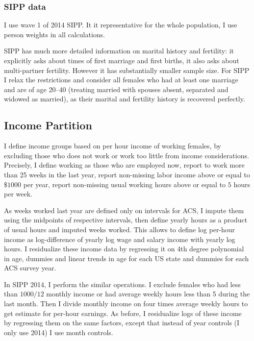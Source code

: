 \documentclass[12pt,letter]{article}
\begin{document}
\subsubsection{SIPP data}

I use wave 1 of 2014 SIPP. It it representative for the whole population, I use person weights in all calculations.

SIPP has much more detailed information on marital history and fertility: it explicitly asks about times of first marriage and first births, it also asks about multi-partner fertility. However it has substantially smaller sample size. For SIPP I relax the restrictions and consider all females who had at least one marriage and are of age 20--40 (treating married with spouses absent, separated and widowed as married), as their marital and fertility history is recovered perfectly.


\subsection{Income Partition\label{inc-part}}
I define income groups based on per hour income of working females, by excluding those who does not work or work too little from income considerations. Precisely, I define working as those who are employed now, report to work more than 25 weeks in the last year, report non-missing labor income above or equal to $\$1000$ per year, report non-missing usual working hours above or equal to $5$ hours per week.

As weeks worked last year are defined only on intervals for ACS, I impute them using the midpoints of respective intervals, then define yearly hours as a product of usual hours and imputed weeks worked. This allows to define log per-hour income as log-difference of yearly log wage and salary income with yearly log hours. I residualize these income data by regressing it on 4th degree polynomial in age, dummies and linear trends in age for each US state and dummies for each ACS survey year.

In SIPP 2014, I perform the similar operations. I exclude females who had less than $1000/12$ monthly income or had average weekly hours less than 5 during the last month. Then I divide monthly income on four times average weekly hours to get estimate for per-hour earnings. As before, I residualize logs of these income by regressing them on the same factors, except that instead of year controls (I only use 2014) I use month controls.
\end{document}
